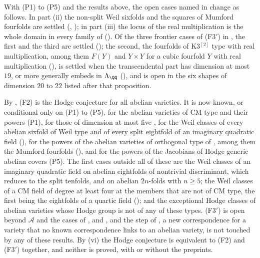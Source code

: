 \begin{remark}\label{rem:remains}
With (P1) to (P5) and the results above, the open cases named in
 change as follows. In part (ii) the non-split Weil
sixfolds and the squares of Mumford fourfolds are settled
(, ); in part (iii) the locus of the
real multiplication is the whole domain in every family of 
(). Of the three frontier cases of \textup{(F3$'$)} in
, the first and the third are settled
(); the second, the fourfolds of K3$^{[2]}$ type with real
multiplication, among them $F(Y)$ and $Y\times Y$ for a cubic fourfold $Y$
with real multiplication (), is settled when the
transcendental part has dimension at most $19$, or more generally embeds in
$\Lambda_{\QQ}$ (), and is open in the six shapes of
dimension $20$ to $22$ listed after that proposition.

By , (F2) is the Hodge conjecture for all abelian
varieties. It is now known, or conditional only on (P1) to (P5), for the
abelian varieties of CM type and their powers (P1), for those of dimension at
most five \cite{Mar25a,Mar25b,MZ99}, for the Weil classes of every abelian
sixfold of Weil type and of every split eightfold of an imaginary quadratic
field (), for the powers of the abelian varieties of
orthogonal type of , among them the Mumford fourfolds
(), and for the powers of the Jacobians of Hodge
generic abelian covers (P5). The first cases outside all of these are the
Weil classes of an imaginary quadratic field on abelian eightfolds of
nontrivial discriminant, which  reduces to the split
tenfolds, and on abelian $2n$-folds with $n\ge5$; the Weil classes of a CM
field of degree at least four at the members that are not of CM type, the
first being the eightfolds of a quartic field (); and
the exceptional Hodge classes of abelian varieties whose Hodge group is not
of any of these types. \textup{(F3$'$)} is open beyond $\mathcal{A}$ and the
cases of ,  and
, and the step of
, a new correspondence for a variety that no known
correspondence links to an abelian variety, is not touched by any of these
results. By (vi) the Hodge conjecture is equivalent to (F2)
and \textup{(F3$'$)} together, and neither is proved, with or without the
preprints.
\end{remark}
